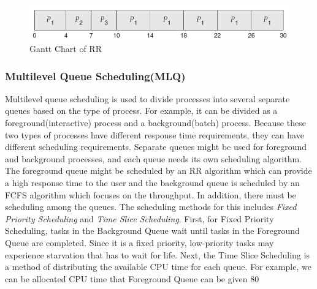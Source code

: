 \documentclass{homework}
\begin{document}
\begin{figure}[h]
\begin{center}
\includegraphics[scale=0.7]{3.png}    
\caption{Gantt Chart of RR}
\end{center}
\end{figure}

\subsubsection{Multilevel Queue Scheduling(MLQ)}
Multilevel queue scheduling is used to divide processes into several separate queues based on the type of process. For example, it can be divided as a foreground(interactive) process and a background(batch) process. Because these two types of processes have different response time requirements, they can have different scheduling requirements. Separate queues might be used for foreground and background processes, and each queue needs its own scheduling algorithm. The foreground queue might be scheduled by an RR algorithm which can provide a high response time to the user and the background queue is scheduled by an FCFS algorithm which focuses on the throughput. In addition, there must be scheduling among the queues. The scheduling methods for this includes \textit{Fixed Priority Scheduling} and \textit{Time Slice Scheduling}. First, for Fixed Priority Scheduling, tasks in the Background Queue wait until tasks in the Foreground Queue are completed. Since it is a fixed priority, low-priority tasks may experience starvation that has to wait for life. Next, the Time Slice Scheduling is a method of distributing the available CPU time for each queue. For example, we can be allocated CPU time that Foreground Queue can be given 80%
\end{document}
